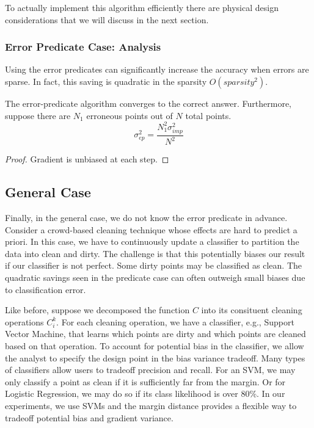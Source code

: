 To actually implement this algorithm efficiently there are physical design considerations that we will discuss in the next section.

\subsubsection{Error Predicate Case: Analysis}
Using the error predicates can significantly increase the accuracy when errors are sparse.
In fact, this saving is quadratic in the sparsity $O(sparsity^2)$.
\begin{theorem}
The error-predicate algorithm converges to the correct answer.
Furthermore, suppose there are $N_1$ erroneous points out of $N$ total points.
\[\sigma^2_{ep} = \frac{N^2_1\sigma^2_{imp}}{N^2}\]
\end{theorem}
\begin{proof}
Gradient is unbiased at each step.
\end{proof}

\subsection{General Case}
Finally, in the general case, we do not know the error predicate in advance.
Consider a crowd-based cleaning technique whose effects are hard to predict a priori. 
In this case, we have to continuously update a classifier to partition the data into 
clean and dirty.
The challenge is that this potentially biases our result if our classifier is not perfect.
Some dirty points may be classified as clean.
The quadratic savings seen in the predicate case can often outweigh small biases due to classification error.

Like before, suppose we decomposed the function $C$ into its consituent cleaning operations ${C}_i^{k}$.
For each cleaning operation, we have a classifier, e.g., Support Vector Machine, that learns which points are dirty and which points are cleaned based on that operation.
To account for potential bias in the classifier, we allow the analyst to specify the design point in the bias variance tradeoff.
Many types of classifiers allow users to tradeoff precision and recall.
For an SVM, we may only classify a point as clean if it is sufficiently far from the margin.
Or for Logistic Regression, we may do so if its class likelihood is over 80\%.
In our experiments, we use SVMs and the margin distance provides a flexible way to tradeoff potential bias and gradient variance.

